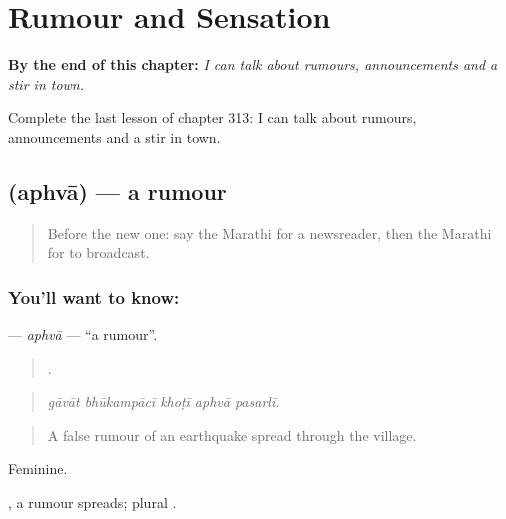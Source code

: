 
\chapter{Rumour and Sensation}
\label{ch:mr-rumour-and-sensation}

\begin{chapteropening}
\textbf{By the end of this chapter:} \emph{I can talk about rumours, announcements and a stir in town.}

Complete the last lesson of chapter 313: I can talk about rumours, announcements and a stir in town.
\end{chapteropening}

\section[\texorpdfstring{\mr{अफवा} (aphvā)}{अफवा (aphvā)}]{ (aphvā) — a rumour}

\label{lesson:MR-C313-aphva}



\begin{quote}
Before the new one: say the Marathi for a newsreader, then the Marathi for to broadcast.
\end{quote}

\subsection*{You'll want to know: }
\textbf{} — \emph{aphvā} — \textquotedblleft{}a rumour\textquotedblright{}.

\begin{quote}
    .
\end{quote}

\begin{quote}
\emph{gāvāt bhūkampācī khoṭī aphvā pasarlī.}
\end{quote}

\begin{quote}
A false rumour of an earthquake spread through the village.
\end{quote}

Feminine.

 , a rumour spreads; plural .

